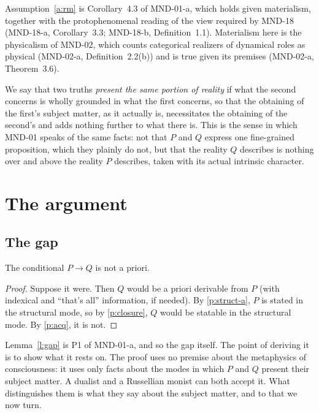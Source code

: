 \documentclass{situationist-preprint}
\begin{document}
Assumption~\ref{a:rm} is Corollary~4.3 of MND-01-a, which holds given materialism, together with the protophenomenal reading of the view required by MND-18 (MND-18-a, Corollary~3.3; MND-18-b, Definition~1.1). Materialism here is the physicalism of MND-02, which counts categorical realizers of dynamical roles as physical (MND-02-a, Definition~2.2(b)) and is true given its premises (MND-02-a, Theorem~3.6).

We say that two truths \emph{present the same portion of reality} if what the second concerns is wholly grounded in what the first concerns, so that the obtaining of the first's subject matter, as it actually is, necessitates the obtaining of the second's and adds nothing further to what there is. This is the sense in which MND-01 speaks of the same facts: not that $P$ and $Q$ express one fine-grained proposition, which they plainly do not, but that the reality $Q$ describes is nothing over and above the reality $P$ describes, taken with its actual intrinsic character.

\section{The argument}\label{s:arg}

\subsection{The gap}

\begin{lemma}\label{l:gap}
The conditional $P \to Q$ is not a priori.
\end{lemma}

\begin{proof}
Suppose it were. Then $Q$ would be a priori derivable from $P$ (with indexical and \enquote{that's all} information, if needed). By \ref{p:struct-a}, $P$ is stated in the structural mode, so by \ref{p:closure}, $Q$ would be statable in the structural mode. By \ref{p:acq}, it is not.
\end{proof}

Lemma~\ref{l:gap} is P1 of MND-01-a, and so the gap itself. The point of deriving it is to show what it rests on. The proof uses no premise about the metaphysics of consciousness: it uses only facts about the modes in which $P$ and $Q$ present their subject matter. A dualist and a Russellian monist can both accept it. What distinguishes them is what they say about the subject matter, and to that we now turn.
\end{document}
